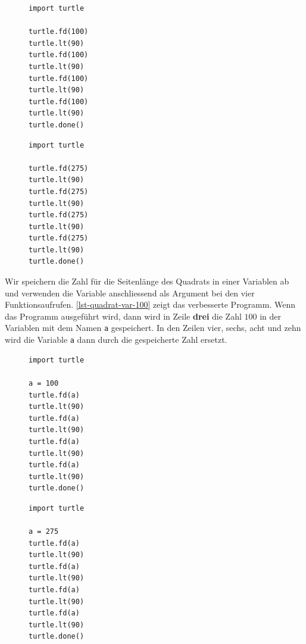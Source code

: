 \begin{figure}[htb]
\centering
\begin{minipage}{0.4\linewidth}
\centering
\begin{lstlisting}[caption={Quadrat (Länge $100$).}, label=lst-quadrat-100]
import turtle

turtle.fd(100)
turtle.lt(90)
turtle.fd(100)
turtle.lt(90)
turtle.fd(100)
turtle.lt(90)
turtle.fd(100)
turtle.lt(90)
turtle.done()
\end{lstlisting}
\end{minipage}
\hfill
\begin{minipage}{0.4\linewidth}
\centering
\begin{lstlisting}[caption={Quadrat (Länge $275$).}, label=lst-quadrat-275]
import turtle

turtle.fd(275)
turtle.lt(90)
turtle.fd(275)
turtle.lt(90)
turtle.fd(275)
turtle.lt(90)
turtle.fd(275)
turtle.lt(90)
turtle.done()
\end{lstlisting}
\end{minipage}
\end{figure}

Wir speichern die Zahl für die Seitenlänge des Quadrats in einer Variablen ab und verwenden die Variable anschliessend als Argument bei den vier Funktionsaufrufen. \autoref{lst-quadrat-var-100} zeigt das verbesserte Programm. Wenn das Programm ausgeführt wird, dann wird in Zeile \textbf{drei} die Zahl $100$ in der Variablen mit dem Namen \lstinline{a} gespeichert. In den Zeilen vier, sechs, acht und zehn wird die Variable \lstinline{a} dann durch die gespeicherte Zahl ersetzt.

\begin{figure}[htb]
\centering
\begin{minipage}{0.4\linewidth}
\centering
\begin{lstlisting}[caption={Die Variable \lstinline{a} speichert die Zahl $100$ (\graybgtexttt{quadrat\_var.py}).}, label=lst-quadrat-var-100]
import turtle

a = 100
turtle.fd(a)
turtle.lt(90)
turtle.fd(a)
turtle.lt(90)
turtle.fd(a)
turtle.lt(90)
turtle.fd(a)
turtle.lt(90)
turtle.done()
\end{lstlisting}
\end{minipage}
\hfill
\begin{minipage}{0.4\linewidth}
\centering
\begin{lstlisting}[caption={Zeile drei wurde angepasst - nun wird die Zahl $275$ gespeichert.}, label=lst-quadrat-var-275]
import turtle

a = 275
turtle.fd(a)
turtle.lt(90)
turtle.fd(a)
turtle.lt(90)
turtle.fd(a)
turtle.lt(90)
turtle.fd(a)
turtle.lt(90)
turtle.done()
\end{lstlisting}
\end{minipage}
\end{figure}

